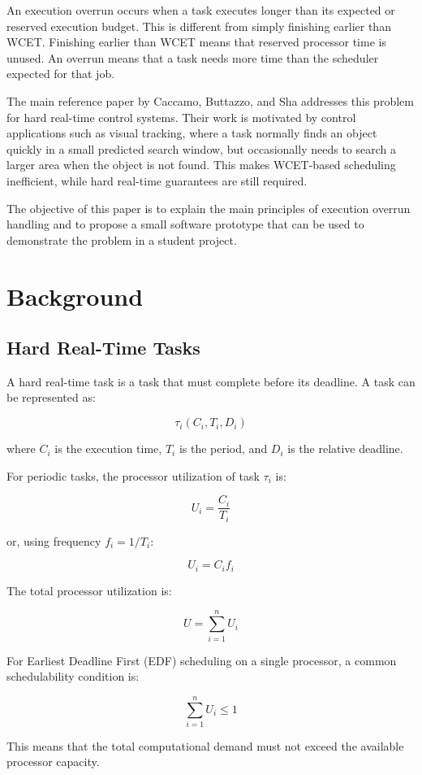 \documentclass[conference]{IEEEtran}
\begin{document}
An execution overrun occurs when a task executes longer than its expected or reserved execution budget. This is different from simply finishing earlier than WCET. Finishing earlier than WCET means that reserved processor time is unused. An overrun means that a task needs more time than the scheduler expected for that job.

The main reference paper by Caccamo, Buttazzo, and Sha addresses this problem for hard real-time control systems. Their work is motivated by control applications such as visual tracking, where a task normally finds an object quickly in a small predicted search window, but occasionally needs to search a larger area when the object is not found. This makes WCET-based scheduling inefficient, while hard real-time guarantees are still required.

The objective of this paper is to explain the main principles of execution overrun handling and to propose a small software prototype that can be used to demonstrate the problem in a student project.

\section{Background}

\subsection{Hard Real-Time Tasks}

A hard real-time task is a task that must complete before its deadline. A task can be represented as:

\[
\tau_i(C_i, T_i, D_i)
\]

where $C_i$ is the execution time, $T_i$ is the period, and $D_i$ is the relative deadline.

For periodic tasks, the processor utilization of task $\tau_i$ is:

\[
U_i = \frac{C_i}{T_i}
\]

or, using frequency $f_i = 1/T_i$:

\[
U_i = C_i f_i
\]

The total processor utilization is:

\[
U = \sum_{i=1}^{n} U_i
\]

For Earliest Deadline First (EDF) scheduling on a single processor, a common schedulability condition is:

\[
\sum_{i=1}^{n} U_i \leq 1
\]

This means that the total computational demand must not exceed the available processor capacity.
\end{document}
